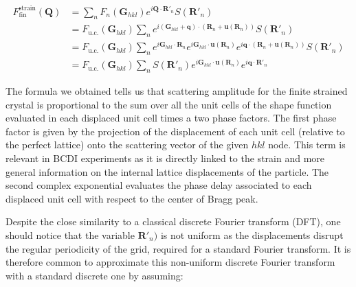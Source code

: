 \begin{equation}
    \begin{aligned}
        F^{\text{strain}}_{\text{fin}}(\mathbf{Q}) &= 
        \sum_{n} F_n(\mathbf{G}_{hkl}) e^{i \mathbf{Q} \cdot \mathbf{R}'_n} S(\mathbf{R}'_n) \\
        &= F_{\text{u.c.}}(\mathbf{G}_{hkl}) \sum_{n}  e^{i (\mathbf{G}_{hkl} + \mathbf{q}) \cdot  (\mathbf{R}_n + \mathbf{u}(\mathbf{R}_n)) } S(\mathbf{R}'_n) \\
        &= F_{\text{u.c.}}(\mathbf{G}_{hkl}) \sum_{n}  e^{i \mathbf{G}_{hkl}\cdot  \mathbf{R}_n} e^{i \mathbf{G}_{hkl} \cdot  \mathbf{u}(\mathbf{R}_n) } e^{i \mathbf{q} \cdot  (\mathbf{R}_n + \mathbf{u}(\mathbf{R}_n)) } S(\mathbf{R}'_n) \\
        &= F_{\text{u.c.}}(\mathbf{G}_{hkl}) \sum_{n} S(\mathbf{R}'_n) e^{i \mathbf{G}_{hkl} \cdot  \mathbf{u}(\mathbf{R}_n) } e^{i \mathbf{q} \cdot  \mathbf{R}'_n }
    \end{aligned}
    \label{eq:strain_fin4}
\end{equation}

The formula we obtained tells us that scattering amplitude for the finite strained crystal is proportional to the 
sum over all the unit cells of the shape function evaluated in each displaced unit cell times a two phase factors. 
The first phase factor is given by the projection of the displacement of each unit cell (relative to the perfect lattice) 
onto the scattering vector of the given $hkl$ node. This term is relevant in BCDI experiments as it is directly linked to 
the strain and more general information on the internal lattice displacements of the particle. 
The second complex exponential evaluates the phase delay associated to each displaced unit cell with respect to the 
center of Bragg peak. 

Despite the close similarity to a classical discrete Fourier transform (DFT), one should notice that the variable $\mathbf{R}'_n)$ 
is not uniform as the displacements disrupt the regular periodicity of the grid, required for a standard Fourier transform. 
It is therefore common to approximate this non-uniform discrete Fourier transform with a standard discrete one by assuming: 

